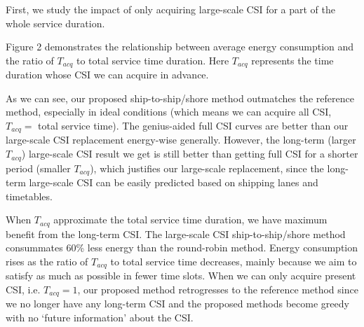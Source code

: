 \documentclass[conference]{IEEEtran}
\begin{document}
 
 First, we study the impact of only acquiring large-scale CSI for a part of the whole service duration. 
 
 Figure 2 demonstrates the relationship between average energy consumption and the ratio of ${T_{acq}}$ to total service time duration. Here ${T_{acq}}$ represents the time duration whose CSI we can acquire in advance. %
 
 As we can see, our proposed ship-to-ship/shore method outmatches the reference method, especially in ideal conditions (which means we can acquire all CSI, ${T_{acq}}=$ total service time). 
 The genius-aided full CSI curves are better than our large-scale CSI replacement energy-wise generally. 
 However, the long-term (larger $T_{acq}$) large-scale CSI result we get is still better than getting full CSI for a shorter period (smaller $T_{acq}$), which justifies our large-scale replacement, since the long-term large-scale CSI can be easily predicted based on shipping lanes and timetables. 
 
 When ${T_{acq}}$ approximate the total service time duration, we have maximum benefit from the long-term CSI. The large-scale CSI ship-to-ship/shore method consummates 60\% less energy than the round-robin method. 
 Energy consumption rises as the ratio of ${T_{acq}}$ to total service time decreases, mainly because we aim to satisfy as much as possible in fewer time slots. When we can only acquire present CSI, i.e. ${T_{acq}} = 1$, our proposed method retrogresses to the reference method since we no longer have any long-term CSI and the proposed methods become greedy with no `future information' about the CSI. 
 
 
 
\end{document}

